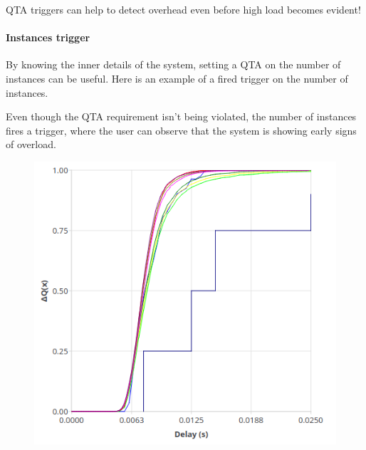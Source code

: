    QTA triggers can help to detect overhead even before high load becomes evident!

        \paragraph{Instances trigger}
        By knowing the inner details of the system, setting a QTA on the number of instances can be useful. Here is an example of a fired trigger on the number of instances.

        Even though the QTA requirement isn't being violated, the number of instances fires a trigger, where the user can observe that the system is showing early signs of overload.
        \begin{figure}[H]
            \begin{center}
                \includegraphics[scale=0.5]{img/overload_2/fired_sample.png}
            \end{center}
        \end{figure}
  
